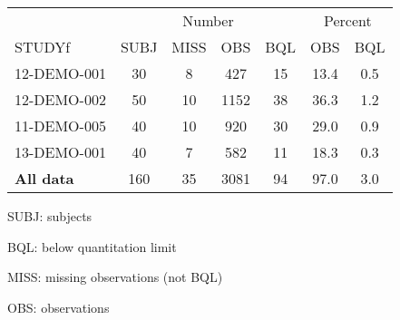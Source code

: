 \setlength{\tabcolsep}{5pt} 
\begin{threeparttable}
\renewcommand{\arraystretch}{1.3}
\begin{tabular}[h]{lcccccc}
\hline
\multicolumn{1}{c}{} & \multicolumn{4}{c}{Number} & \multicolumn{2}{c}{Percent} \\
\cmidrule(lr){2-5}
\cmidrule(lr){6-7}
STUDYf & SUBJ & MISS & OBS & BQL & OBS & BQL \\
\hline
12-DEMO-001 & 30 & 8 & 427 & 15 & 13.4 & 0.5 \\
12-DEMO-002 & 50 & 10 & 1152 & 38 & 36.3 & 1.2 \\
11-DEMO-005 & 40 & 10 & 920 & 30 & 29.0 & 0.9 \\
13-DEMO-001 & 40 & 7 & 582 & 11 & 18.3 & 0.3 \\
\hline \hline {\bf All data} & 160 & 35 & 3081 & 94 & 97.0 & 3.0 \\
\hline
\end{tabular}
\begin{tablenotes}[flushleft]
\item SUBJ: subjects
\item BQL: below quantitation limit
\item MISS: missing observations (not BQL)
\item OBS: observations
\end{tablenotes}
\end{threeparttable}
